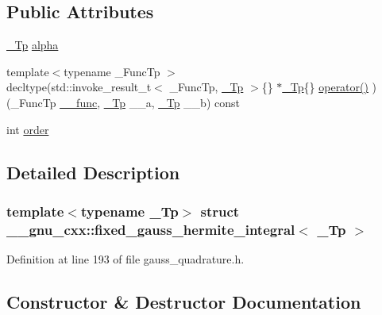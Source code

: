 \subsection*{Public Attributes}
\begin{DoxyCompactItemize}
\item 
\hyperlink{namespace____gnu__cxx_a3b19a9c800ca194374ef9172290f7d79}{\+\_\+\+Tp} \hyperlink{struct____gnu__cxx_1_1fixed__gauss__hermite__integral_a2e8e1a2af7c80ed56beba1a49d222c2e}{alpha}
\item 
{\footnotesize template$<$typename \+\_\+\+Func\+Tp $>$ }\\decltype(std\+::invoke\+\_\+result\+\_\+t$<$ \+\_\+\+Func\+Tp, \hyperlink{namespace____gnu__cxx_a3b19a9c800ca194374ef9172290f7d79}{\+\_\+\+Tp} $>$\{\} $\ast$\hyperlink{namespace____gnu__cxx_a3b19a9c800ca194374ef9172290f7d79}{\+\_\+\+Tp}\{\} \hyperlink{struct____gnu__cxx_1_1fixed__gauss__hermite__integral_a9d7212ceef93046f59568b551e9eef1e}{operator()} )(\+\_\+\+Func\+Tp \hyperlink{namespace____gnu__cxx_af2b2f0c7a2ae72b922b1afefae5a65b2}{\+\_\+\+\_\+func}, \hyperlink{namespace____gnu__cxx_a3b19a9c800ca194374ef9172290f7d79}{\+\_\+\+Tp} \+\_\+\+\_\+a, \hyperlink{namespace____gnu__cxx_a3b19a9c800ca194374ef9172290f7d79}{\+\_\+\+Tp} \+\_\+\+\_\+b) const
\item 
int \hyperlink{struct____gnu__cxx_1_1fixed__gauss__hermite__integral_ad2678dce9fba6604be4d2839c6bc7646}{order}
\end{DoxyCompactItemize}


\subsection{Detailed Description}
\subsubsection*{template$<$typename \+\_\+\+Tp$>$\newline
struct \+\_\+\+\_\+gnu\+\_\+cxx\+::fixed\+\_\+gauss\+\_\+hermite\+\_\+integral$<$ \+\_\+\+Tp $>$}



Definition at line 193 of file gauss\+\_\+quadrature.\+h.



\subsection{Constructor \& Destructor Documentation}
\mbox{\label{struct____gnu__cxx_1_1fixed__gauss__hermite__integral_afb6f594f7724e05c648326005e4302a7}} 
